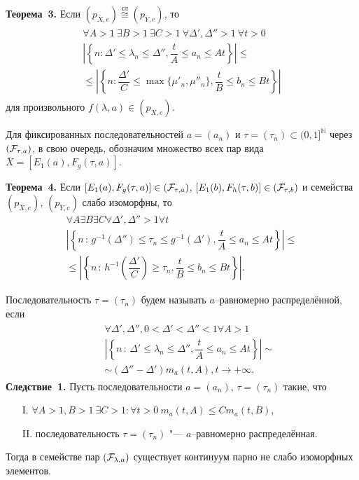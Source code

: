 \noindent\textbf{Теорема~3.}
Если
$(p_{\overline{X},e})\stackrel{\text{сл}}{\cong}(p_{\overline{Y},e})$, то
\begin{eqnarray}
\begin{aligned}
\forall{A>1}\ \exists{B>1}\ \exists{C>1}\ \forall{\Delta', \Delta ''>1}\ \forall{t>0} \\
\left|\left\{
n:\Delta '\leqslant \lambda_n \leqslant \Delta'', \dfrac{t}{A} \leqslant a_n \leqslant At
\right\}\right| \leqslant \\ \leqslant
\left|\left\{
n:\dfrac{\Delta'}{C}\leqslant \max\{\mu'_n,\mu''_n \}, \dfrac{t}{B} \leqslant b_n \leqslant Bt
\right\}\right|
\end{aligned} \label{Finv}
\end{eqnarray}
для произвольного $f(\lambda,a) \in (p_{\overline{X},e})$.

Для фиксированных последовательностей $a=(a_n)$ и $\tau =(\tau_n)\subset (0,1]^{\mathbb N}$ через
$({\cal F}_{\tau ,a})$, в свою очередь, обозначим множество всех
пар вида $\overline{X}=[E_1(a),F_g(\tau ,a)]$.

\noindent\textbf{Теорема~4.}
Если $[E_1(a),F_g(\tau ,a)]\in ({\cal F}_{\tau ,a})$, $[E_1(b),F_h(\tau ,b)]\in ({\cal F}_{\tau ,b})$ и семейства
$(p_{\overline{X},e})$, $(p_{\overline{Y},e})$ слабо изоморфны, то
\begin{eqnarray*}
\forall{A}\exists{B}\exists{C}\forall{\Delta ',\Delta ''>1} \forall{t}\\
\left|\left\{
n\,:\,g^{-1}(\Delta '') \leqslant \tau_n \leqslant g^{-1}(\Delta'),\dfrac{t}{A}\leqslant a_n \leqslant At
\right\}\right|\leqslant\\ \leqslant
\left|\left\{
n\,:\,h^{-1}\left(\dfrac{\Delta'}{C}\right)\geqslant \tau_n ,\dfrac{t}{B}\leqslant b_n \leqslant Bt
\right\}\right|.
\end{eqnarray*}

Последовательность $\tau =(\tau_n)$ будем называть $a$--равномерно распределённой, если
\begin{eqnarray}
\begin{aligned}
&&\forall{\Delta ',\Delta '',0<\Delta '<\Delta ''<1} \forall{A>1} \\
&&\left|\left\{ n\,:\, \Delta '\leqslant \lambda_n \leqslant \Delta '',
\dfrac{t}{A}\leqslant a_n\leqslant At\right\}\right|\sim \\
&&\sim
(\Delta ''-\Delta ')m_a(t,A), t\to+\infty .
\end{aligned}\nonumber
\end{eqnarray}
\noindent\textbf{Следствие~1.}
Пусть последовательности $a=(a_n)$, $\tau=(\tau_n)$ такие, что
\begin{itemize}
\item[I.] $\forall{A>1, B>1}\ \exists{C>1:}\forall{t>0}\ m_a(t,A)\leqslant C m_a(t,B)$,
\item[II.] последовательность $\tau=(\tau_n)$ "--- $a$--равномерно распределённая.
\end{itemize}
Тогда в семействе
пар $({\cal F}_{\lambda ,a})$ существует континуум парно не слабо изоморфных элементов.


